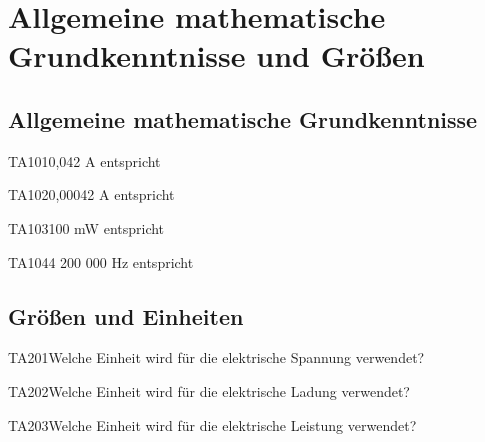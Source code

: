 \section{Allgemeine mathematische Grundkenntnisse und Größen}

\subsection{Allgemeine mathematische Grundkenntnisse}

\begin{question}{TA101}{0,042 A entspricht}
\end{question}

\begin{question}{TA102}{0,00042 A entspricht}
\end{question}

\begin{question}{TA103}{100 mW entspricht}
\end{question}

\begin{question}{TA104}{4 200 000 Hz entspricht}
\end{question}

\subsection{Größen und Einheiten}

\begin{question}{TA201}{Welche Einheit wird für die elektrische Spannung verwendet?}
\end{question}

\begin{question}{TA202}{Welche Einheit wird für die elektrische Ladung verwendet?}
\end{question}

\begin{question}{TA203}{Welche Einheit wird für die elektrische Leistung verwendet?}
\end{question}

